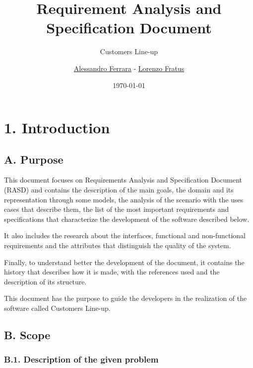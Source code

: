 
\usepackage{clipboard}
\usepackage{listings}
\usepackage{assets/rasd/alloy/alloy-style}
\graphicspath{ {assets/rasd/} }

\title{Requirement Analysis and\\Specification Document}
\subtitle{Customers Line-up}
\author{\href{https://github.com/ferrohd}{Alessandro Ferrara} -
\href{https://github.com/lorenzofratus}{Lorenzo Fratus}}
\date{\today}



\maketitle

\tableofcontents

\chapter{1. Introduction}

\section{A. Purpose}

This document focuses on Requirements Analysis and Specification
Document (RASD) and contains the description of the main goals, the domain and its representation through some models, the analysis of the scenario with the uses cases that describe them, the list of the most important requirements and specifications that characterize the development of the software described below.

It also includes the research about the interfaces, functional and non-functional requirements and the attributes that distinguish the quality of the system.

Finally, to understand better the development of the document, it contains the history that describes how it is made, with the references used and the description of its structure.

This document has the purpose to guide the developers in the realization of the software called Customers Line-up.

\section{B. Scope}

\subsection{B.1. Description of the given problem}

